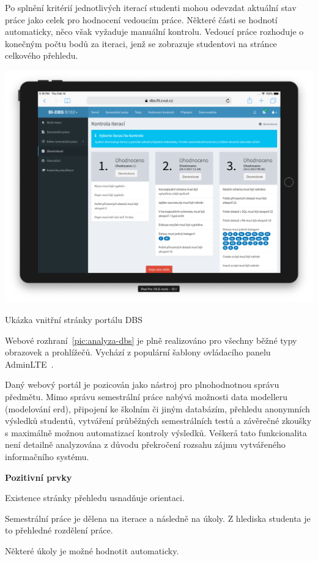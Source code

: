 Po splnění kritérií jednotlivých iterací studenti mohou odevzdat aktuální stav práce jako celek pro hodnocení vedoucím práce. Některé části se hodnotí automaticky, něco však vyžaduje manuální kontrolu. Vedoucí práce rozhoduje o konečným počtu bodů za iteraci, jenž se zobrazuje studentovi na stránce celkového přehledu.

\begin{fig:illustration}
   \includegraphics[width=1\textwidth]{images/analyza-dbs.png}
   \caption{Ukázka vnitřní stránky portálu DBS}\label{pic:analyza-dbs}
\end{fig:illustration}


Webové rozhraní~\ref{pic:analyza-dbs} je plně realizováno pro všechny běžné typy obrazovek a prohlížečů. Vychází z populární šablony ovládacího panelu AdminLTE~\cite{adminLTE}.

Daný webový portál je pozicován jako nástroj pro plnohodnotnou správu předmětu. Mimo správu semestrální práce nabývá možnosti data modelleru (modelování \gls{erd}), připojení ke školním či jiným databázím, přehledu anonymních výsledků studentů, vytváření průběžných semestrálních testů a závěrečné zkoušky s maximálně možnou automatizací kontroly výsledků. Veškerá tato funkcionalita není detailně analyzována z důvodu překročení rozsahu zájmu vytvářeného informačního systému.

\newpage
\textbf{Pozitivní prvky}
\begin{ul}
   \item Existence stránky přehledu usnadňuje orientaci.
   \item Semestrální práce je dělena na iterace a následně na úkoly. Z hlediska studenta je to přehledné rozdělení práce.
   \item Některé úkoly je možné hodnotit automaticky.
\end{ul}

